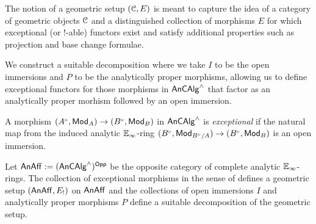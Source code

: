 \begin{remark}\label{rmk: shriek functors and correspondences}
    The notion of a geometric setup $(\EuScript{C},E)$ is meant to capture the idea of a category of geometric objects $\EuScript{C}$ and a distinguished collection of morphisms $E$ for which exceptional (or $!$-able) functors exist and satisfy additional properties such as projection and base change formulae.
\end{remark}
We construct a suitable decomposition where we take $I$ to be the open immersions and $P$ to be the analytically proper morphisms, allowing us to define exceptional functors for those morphisms in $\mathsf{An}\mathsf{CAlg}^{\wedge}$ that factor as an analytically proper morhism followed by an open immersion. 
\begin{definition}\label{def: exceptional morphisms of analytic rings}
    A morphism $(A^{\tri},\Mod_{A})\to (B^{\tri},\Mod_{B})$ in $\mathsf{An}\mathsf{CAlg}^{\wedge}$ is \emph{exceptional} if the natural map from the induced analytic $\mathbb{E}_{\infty}$-ring $(B^{\tri},\Mod_{B^{\tri}/A})\to (B^{\tri},\Mod_{B})$ is an open immersion.
\end{definition} 
\begin{lemma}\label{lem: geometric setup on analytic E-infinity rings}
    Let $\mathsf{An}\mathsf{Aff}:=(\mathsf{An}\mathsf{CAlg}^{\wedge})^{\mathsf{Opp}}$ be the opposite category of complete analytic $\mathbb{E}_{\infty}$-rings. The collection of exceptional morphisms in the sense of  defines a geometric setup $(\mathsf{An}\mathsf{Aff},E_{!})$ on $\mathsf{An}\mathsf{Aff}$ and the collections of open immersions $I$ and analytically proper morphisms $P$ define a suitable decomposition of the geometric setup. 
\end{lemma}
